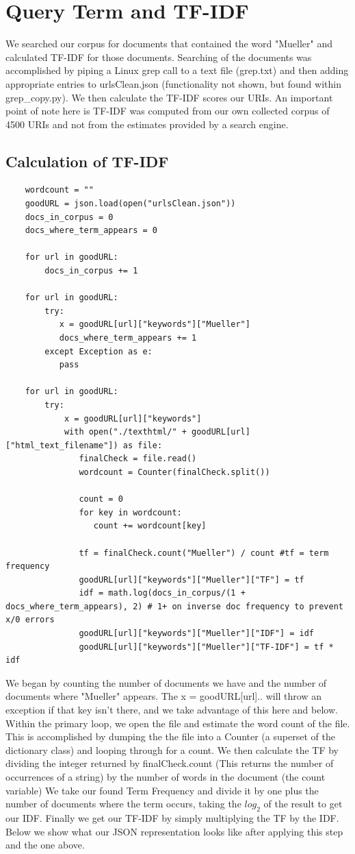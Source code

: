 \documentclass[11pt]{article}
\begin{document}
	\section{Query Term and TF-IDF}
	\hspace{10mm} We searched our corpus for documents that contained the word "Mueller" and calculated TF-IDF for those documents. Searching of the documents was accomplished by piping a Linux grep call to a text file (grep.txt) and then adding appropriate entries to urlsClean.json (functionality not shown, but found within grep\_copy.py). We then calculate the TF-IDF scores our URIs. An important point of note here is TF-IDF was computed from our own collected corpus of 4500 URIs and not from the estimates provided by a search engine. 
	\subsection{Calculation of TF-IDF}
	\begin{lstlisting}
	wordcount = ""
	goodURL = json.load(open("urlsClean.json"))
	docs_in_corpus = 0
	docs_where_term_appears = 0
	
	for url in goodURL:
	    docs_in_corpus += 1
	
	for url in goodURL:
	    try:
	       x = goodURL[url]["keywords"]["Mueller"]
	       docs_where_term_appears += 1
	    except Exception as e:
	       pass
	
	for url in goodURL:
	    try:
	        x = goodURL[url]["keywords"]
	        with open("./texthtml/" + goodURL[url]["html_text_filename"]) as file:
	           finalCheck = file.read()
	           wordcount = Counter(finalCheck.split())
	
	           count = 0
	           for key in wordcount:
	              count += wordcount[key]
	
	           tf = finalCheck.count("Mueller") / count #tf = term frequency
	           goodURL[url]["keywords"]["Mueller"]["TF"] = tf
	           idf = math.log(docs_in_corpus/(1 + docs_where_term_appears), 2) # 1+ on inverse doc frequency to prevent x/0 errors
	           goodURL[url]["keywords"]["Mueller"]["IDF"] = idf
	           goodURL[url]["keywords"]["Mueller"]["TF-IDF"] = tf * idf
	\end{lstlisting}
	\hspace{10mm} We began by counting the number of documents we have and the number of documents where "Mueller" appears. The x = goodURL[url].. will throw an exception if that key isn't there, and we take advantage of this here and below. Within the primary loop, we open the file and estimate the word count of the file. This is accomplished by dumping the the file into a Counter (a superset of the dictionary class) and looping through for a count. We then calculate the TF by dividing the integer returned by finalCheck.count (This returns the number of occurrences of a string) by the number of words in the document (the count variable) We take our found Term Frequency and divide it by one plus the number of documents where the term occurs, taking the $log_2$ of the result to get our IDF. Finally we get our TF-IDF by simply multiplying the TF by the IDF. Below we show what our JSON representation looks like after applying this step and the one above. 
\end{document}
